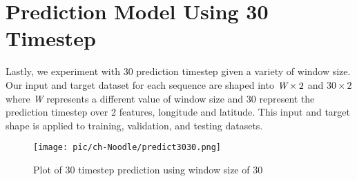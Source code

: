 \section{Prediction Model Using 30 Timestep}
Lastly, we experiment with 30 prediction timestep given a variety of window size. Our input and target dataset for each sequence are shaped into $\emph{W}\times2$ and $30\times2$ where \emph{W} represents a different value of window size and 30 represent the prediction timestep over 2 features, longitude and latitude. This input and target shape is applied to training, validation, and testing datasets.

\begin{table}[t!]
\centering
\caption{Model performance with dynamic window size and 30 prediction timestep}
\label{tab:target10}
\end{table}

\begin{figure}[b!]
    \centering
    \texttt{[image: pic/ch-Noodle/predict3030.png]}
    \caption{Plot of 30 timestep prediction using window size of 30}
    \label{fig:predict3030_1}
\end{figure}


